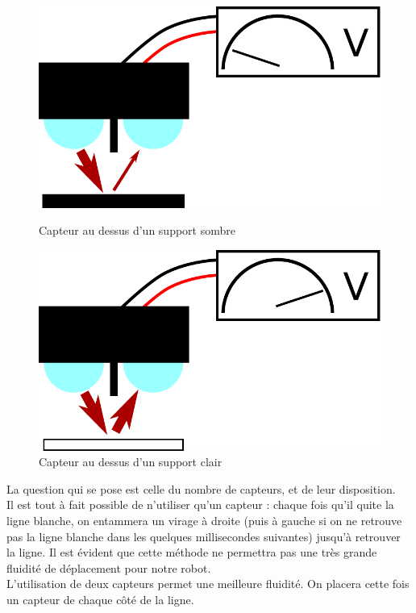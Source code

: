 \begin{figure}[ht!]
	\centering
	\begin{minipage}{0.48\textwidth}
		\centering
		\includegraphics[scale=0.45]{Graphics/capteurOptiqueFondNoir.pdf}
		\caption{Capteur au dessus d'un support sombre}
	\end{minipage}\hfill
	\begin{minipage}{0.48\textwidth}
		\centering
		\includegraphics[scale=0.45]{Graphics/capteurOptiqueFondBlanc.pdf}
		\caption{Capteur au dessus d'un support clair}
	\end{minipage}
\end{figure}

La question qui se pose est celle du nombre de capteurs, et de leur disposition.\\

Il est tout à fait possible de n'utiliser qu'un capteur : chaque fois qu'il quite la ligne blanche, on entammera un virage à droite (puis à gauche si on ne retrouve pas la ligne blanche dans les quelques millisecondes suivantes) jusqu'à retrouver la ligne. Il est évident que cette méthode ne permettra pas une très grande fluidité de déplacement pour notre robot.\\

L'utilisation de deux capteurs permet une meilleure fluidité. On placera cette fois un capteur de chaque côté de la ligne.